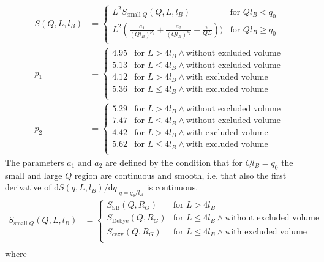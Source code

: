 \begin{align}
S(Q,L,l_B) &=
\begin{cases}
L^2 S_{\textrm{small~} Q}(Q,L,l_B)& \mbox{for~}  Ql_B<q_0 \\
L^2 \left(\frac{a_1}{(Ql_B)^{p_1}}+\frac{a_2}{(Ql_B)^{p_2}}+\frac{\pi}{QL}\right))& \mbox{for~}  Ql_B\geq q_0  \\
\end{cases}\\
p_1 &=
\begin{cases}
4.95 & \mbox{for~} L > 4l_B \wedge \mbox{without excluded volume} \\
5.13 & \mbox{for~} L \leq 4l_B \wedge \mbox{without excluded volume} \\
4.12 & \mbox{for~} L > 4l_B \wedge \mbox{with excluded volume} \\
5.36 & \mbox{for~} L \leq 4l_B \wedge \mbox{with excluded volume} \\
\end{cases}\\
p_2 &=
\begin{cases}
5.29 & \mbox{for~} L > 4l_B \wedge \mbox{without excluded volume} \\
7.47 & \mbox{for~} L \leq 4l_B \wedge \mbox{without excluded volume} \\
4.42 & \mbox{for~} L > 4l_B \wedge \mbox{with excluded volume} \\
5.62 & \mbox{for~} L \leq 4l_B \wedge \mbox{with excluded volume} \\
\end{cases}
\end{align}
The parameters $a_1$ and $a_2$ are defined by the condition that for $Ql_B=q_0$ the small and large $Q$ region are continuous and smooth, i.e. that also the first derivative of $\mathrm{d}S(q,L,l_B)/\mathrm{d}q|_{q=q_0/l_B}$ is continuous.
\begin{align}
S_{\textrm{small~} Q}(Q,L,l_B) &=
\begin{cases}
 S_\textrm{SB}(Q,R_G)    & \mbox{for~} L >    4l_B   \\
 S_\textrm{Debye}(Q,R_G) & \mbox{for~} L \leq 4l_B  \wedge \mbox{without excluded volume}\\
 S_\textrm{cexv}(Q,R_G)  & \mbox{for~} L \leq 4l_B  \wedge \mbox{with excluded volume} \\
\end{cases}\\
\end{align}
where
